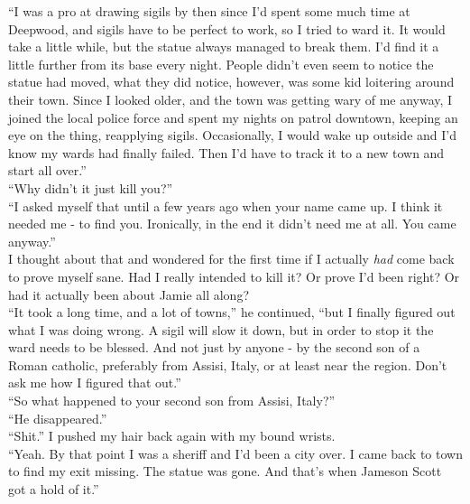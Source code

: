 \documentclass[a5paper]{scrartcl}
\begin{document}
\enquote{I was a pro at drawing sigils by then since I'd spent some much time at Deepwood, and sigils have to be perfect to work, so I tried to ward it. It would take a little while, but the statue always managed to break them. I'd find it a little further from its base every night. People didn't even seem to notice the statue had moved, what they did notice, however, was some kid loitering around their town.  Since I looked older, and the town was getting wary of me anyway, I joined the local police force and spent my nights on patrol downtown, keeping an eye on the thing, reapplying sigils. Occasionally, I would wake up outside and I'd know my wards had finally failed. Then I'd have to track it to a new town and start all over.}\\


\enquote{Why didn't it just kill you?}\\


\enquote{I asked myself that until a few years ago when your name came up. I think it needed me - to find you. Ironically, in the end it didn't need me at all. You came anyway.}\\


I thought about that and wondered for the first time if I actually \textit{had}
 come back to prove myself sane. Had I really intended to kill it? Or prove I'd been right? Or had it actually been about Jamie all along?\\


\enquote{It took a long time, and a lot of towns,} he continued, \enquote{but I finally figured out what I was doing wrong. A sigil will slow it down, but in order to stop it the ward needs to be blessed. And not just by anyone - by the second son of a Roman catholic, preferably from Assisi, Italy, or at least near the region. Don't ask me how I figured that out.}\\


\enquote{So what happened to your second son from Assisi, Italy?}\\


\enquote{He disappeared.}\\


\enquote{Shit.} I pushed my hair back again with my bound wrists.\\


\enquote{Yeah. By that point I was a sheriff and I'd been a city over. I came back to town to find my exit missing. The statue was gone. And that's when Jameson Scott got a hold of it.}\\
\end{document}
